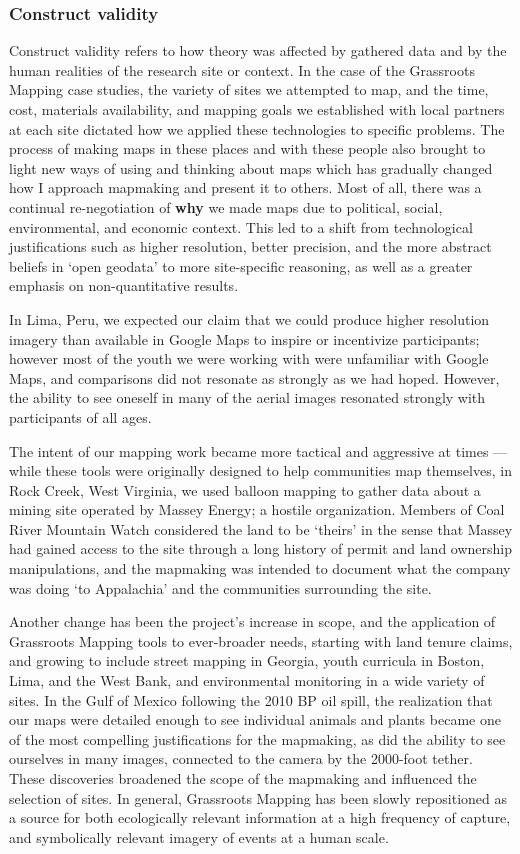 \documentclass[11pt,oneside,notitlepage]{report}
\begin{document}
{{\subsubsection{Construct validity}

Construct validity refers to how theory was affected by gathered data and by the human realities of the research site or context. In the case of the Grassroots Mapping case studies, the variety of sites we attempted to map, and the time, cost, materials availability, and mapping goals we established with local partners at each site dictated how we applied these technologies to specific problems. The process of making maps in these places and with these people also brought to light new ways of using and thinking about maps which has gradually changed how I approach mapmaking and present it to others. Most of all, there was a continual re-negotiation of \textbf{why} we made maps due to political, social, environmental, and economic context. This led to a shift from technological justifications such as higher resolution, better precision, and the more abstract beliefs in `open geodata' to more site-specific reasoning, as well as a greater emphasis on non-quantitative results.  

In Lima, Peru, we expected our claim that we could produce higher resolution imagery than available in Google Maps to inspire or incentivize participants; however most of the youth we were working with were unfamiliar with Google Maps, and comparisons did not resonate as strongly as we had hoped. However, the ability to see oneself in many of the aerial images resonated strongly with participants of all ages. 

The intent of our mapping work became more tactical and aggressive at times --- while these tools were originally designed to help communities map themselves, in Rock Creek, West Virginia, we used balloon mapping to gather data about a mining site operated by Massey Energy; a hostile organization. Members of Coal River Mountain Watch considered the land to be `theirs' in the sense that Massey had gained access to the site through a long history of permit and land ownership manipulations, and the mapmaking was intended to document what the company was doing `to Appalachia' and the communities surrounding the site.

Another change has been the project's increase in scope, and the application of Grassroots Mapping tools to ever-broader needs, starting with land tenure claims, and growing to include street mapping in Georgia, youth curricula in Boston, Lima, and the West Bank, and environmental monitoring in a wide variety of sites. In the Gulf of Mexico following the 2010 BP oil spill, the realization that our maps were detailed enough to see individual animals and plants became one of the most compelling justifications for the mapmaking, as did the ability to see ourselves in many images, connected to the camera by the 2000-foot tether. These discoveries broadened the scope of the mapmaking and influenced the selection of sites. In general, Grassroots Mapping has been slowly repositioned as a source for both ecologically relevant information at a high frequency of capture, and symbolically relevant imagery of events at a human scale.

}}
\end{document}
